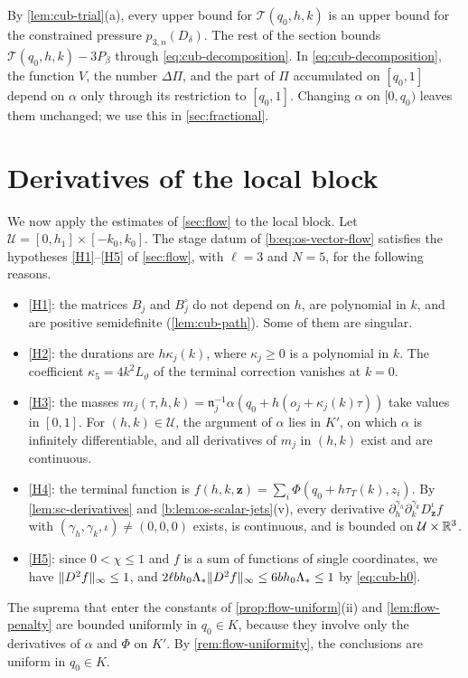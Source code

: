 By \cref{lem:cub-trial}(a), every upper bound for $\mathcal T(q_0,h,k)$ is an
upper bound for the constrained pressure $p_{3,n}(D_\delta)$. The rest of the
section bounds $\mathcal T(q_0,h,k)-3P_\beta$ through \eqref{eq:cub-decomposition}.
In \eqref{eq:cub-decomposition}, the function $V$, the number $\Delta\Pi$, and
the part of $\Pi$ accumulated on $[q_0,1]$ depend on $\alpha$ only through its
restriction to $[q_0,1]$. Changing $\alpha$ on $[0,q_0)$
leaves them unchanged; we use this in \cref{sec:fractional}.

\section{Derivatives of the local block}\label{sec:cub-derivatives}

We now apply the estimates of \cref{sec:flow} to the local block. Let
$\mathcal U=[0,h_1]\times[-k_0,k_0]$. The stage datum of
\eqref{b:eq:os-vector-flow} satisfies the hypotheses \ref{H1}--\ref{H5} of
\cref{sec:flow}, with $\ell=3$ and $N=5$, for the following reasons.
\begin{itemize}
\item \ref{H1}: the matrices $B_j$ and $B_j^\circ$ do not depend on $h$, are
 polynomial in $k$, and are positive semidefinite (\cref{lem:cub-path}). Some
 of them are singular.
\item \ref{H2}: the durations are $h\kappa_j(k)$, where $\kappa_j\ge0$ is a
 polynomial in $k$. The coefficient $\kappa_5=4k^2L_\vartheta$ of the terminal
 correction vanishes at $k=0$.
\item \ref{H3}: the masses $m_j(\tau,h,k)=\mathfrak n_j^{-1}\alpha(q_0+h(o_j+\kappa_j(k)\tau))$
 take values in $[0,1]$. For $(h,k)\in\mathcal U$, the argument of $\alpha$ lies
 in $K'$, on which $\alpha$ is infinitely differentiable, and all derivatives
 of $m_j$ in $(h,k)$ exist and are continuous.
\item \ref{H4}: the terminal function is $f(h,k,\mathbf z)=\sum_i\Phi(q_0+h\tau_T(k),z_i)$.
 By \cref{lem:sc-derivatives} and \cref{b:lem:os-scalar-jets}(v), every
 derivative $\partial_h^{\gamma_h}\partial_k^{\gamma_k}D^\iota_{\mathbf z}f$ with
 $(\gamma_h,\gamma_k,\iota)\ne(0,0,0)$ exists, is continuous, and is bounded on
 $\mathcal U\times\mathbb R^3$.
\item \ref{H5}: since $0<\chi\le1$ and $f$ is a sum of functions of single
 coordinates, we have $\lVert D^2f\rVert_\infty\le1$, and $2\ell bh_0\Lambda_*\lVert D^2f\rVert_\infty
 \le6bh_0\Lambda_*\le1$ by \eqref{eq:cub-h0}.
\end{itemize}
The suprema that enter the constants of \cref{prop:flow-uniform}(ii) and
\cref{lem:flow-penalty} are bounded uniformly in $q_0\in K$, because they involve
only the derivatives of $\alpha$ and $\Phi$ on $K'$. By
\cref{rem:flow-uniformity}, the conclusions are uniform in $q_0\in K$.

